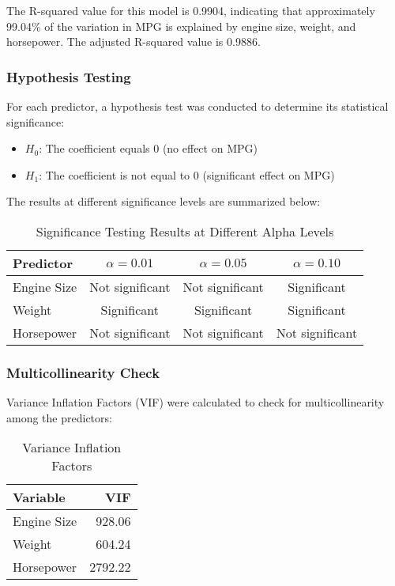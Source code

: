 \documentclass[12pt]{article}
\begin{document}
The R-squared value for this model is 0.9904, indicating that approximately 99.04\% of the variation in MPG is explained by engine size, weight, and horsepower. The adjusted R-squared value is 0.9886.

\subsubsection{Hypothesis Testing}
For each predictor, a hypothesis test was conducted to determine its statistical significance:

\begin{itemize}
    \item $H_0$: The coefficient equals 0 (no effect on MPG)
    \item $H_1$: The coefficient is not equal to 0 (significant effect on MPG)
\end{itemize}

The results at different significance levels are summarized below:

\begin{table}[H]
\centering
\caption{Significance Testing Results at Different Alpha Levels}
\begin{tabular}{lccc}
\toprule
Predictor & $\alpha = 0.01$ & $\alpha = 0.05$ & $\alpha = 0.10$ \\
\midrule
Engine Size & Not significant & Not significant & Significant \\
Weight & Significant & Significant & Significant \\
Horsepower & Not significant & Not significant & Not significant \\
\bottomrule
\end{tabular}
\end{table}

\subsubsection{Multicollinearity Check}
Variance Inflation Factors (VIF) were calculated to check for multicollinearity among the predictors:

\begin{table}[H]
\centering
\caption{Variance Inflation Factors}
\begin{tabular}{lr}
\toprule
Variable & VIF \\
\midrule
Engine Size & 928.06 \\
Weight & 604.24 \\
Horsepower & 2792.22 \\
\bottomrule
\end{tabular}
\end{table}
\end{document}
